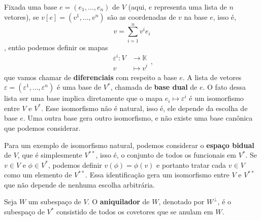 Fixada uma base $e = (e_1, \dots, e_n)$ de $V$ (aqui, $e$ representa uma lista de $n$ vetores), se $v[e] = (v^1, \dots, v^n)$ são as coordenadas de $v$ na base $e$, isso é, \begin{equation}
    v = \sum_{i = 1}^n v^i e_i
\end{equation}, então podemos definir os mapas \begin{equation}
    \begin{split}
        \varepsilon^i \colon V &\to \mathbb{K} \\ v &\mapsto v^i
    \end{split},
\end{equation} que vamos chamar de \textbf{diferenciais} com respeito a base $e$. A lista de vetores $\varepsilon = (\varepsilon^1, \dots, \varepsilon^n)$ é uma base de $V^*$, chamada de \textbf{base dual} de $e$. O fato dessa lista ser uma base implica diretamente que o mapa $e_i \mapsto \varepsilon^i$ é um isomorfismo entre $V$ e $V^*$. Esse isomorfismo não é natural, isso é, ele depende da escolha de base $e$. Uma outra base gera outro isomorfismo, e não existe uma base canônica que podemos considerar.

Para um exemplo de isomorfismo natural, podemos considerar o \textbf{espaço bidual} de $V$, que é simplesmente $V^{**}$, isso é, o conjunto de todos os funcionais em $V^*$. Se $v \in V$ e $\phi \in V^*$, podemos definir $v(\phi) = \phi(v)$ e portanto tratar cada $v \in V$ como um elemento de $V^{**}$. Essa identificação gera um isomorfismo entre $V$ e $V^{**}$ que não depende de nenhuma escolha arbitrária.

Seja $W$ um subespaço de $V$. O \textbf{aniquilador} de $W$, denotado por $W^\perp$, é o subespaço de $V^*$ consistido de todos os covetores que se anulam em $W$.

